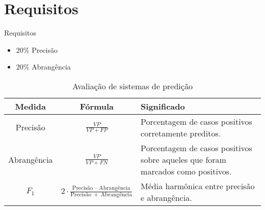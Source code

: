 \section[Requisitos]{Requisitos}
\begin{frame}{Requisitos}

\begin{itemize}
	\item $20\%$ Precisão
	\item $20\%$ Abrangência
\end{itemize}

\begin{table}[htp]
\begin{center}
    \caption{Avaliação de sistemas de predição}
    \vspace{-.5cm}
    \label{tab:avaliacao-predicao}
    \begin{tabular}{  | c | c | p{4cm} | }
    \hline
    \textbf{Medida} & \textbf{Fórmula} & \textbf{Significado} \\ \hline
    Precisão &  $\frac{VP}{VP+FP}$ & Porcentagem de casos positivos corretamente preditos. \\ \hline                            
    Abrangência & $\frac{VP}{VP+FN}$ & Porcentagem de casos positivos sobre aqueles que foram marcados como positivos. \\ \hline
    $F_1$ &  $2 \cdot \frac{\mathrm{Precisão}~\cdot~\mathrm{Abrangência}}{\mathrm{Precisão}~+~\mathrm{Abrangência}}$ & Média harmônica entre precisão e abrangência. \\ \hline
    \end{tabular}
\end{center}
\end{table}

\end{frame}


